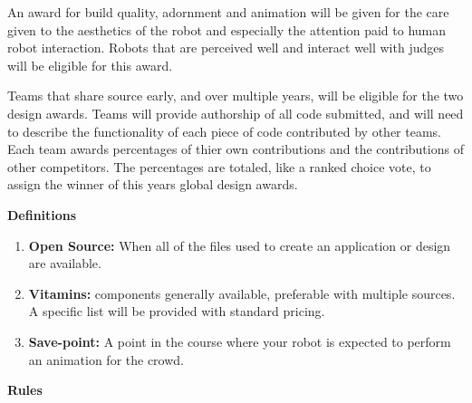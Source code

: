 \documentclass{article}
\begin{document}
 An award for build quality, adornment and animation will be given for the care given to the aesthetics of the robot and especially the attention paid to human robot interaction. Robots that are perceived well and interact well with judges will be eligible for this award. 
 
  Teams that share source early, and over multiple years, will be eligible for the two design awards. Teams will provide authorship of all code submitted, and will need to describe the functionality of each piece of code contributed by other teams. Each team awards percentages of thier own contributions and the contributions of other competitors. The percentages are totaled, like a ranked choice vote, to assign the winner of this years global design awards. 
 
 \pagebreak
 
{\huge \textbf{Definitions}}
\begin{enumerate}
	\item \textbf{Open Source:} When all of the files used to create an application or design are available.
	\item \textbf{Vitamins:} components generally available, preferable with multiple sources. A specific list will be provided with standard pricing.
	\item \textbf{Save-point:} A point in the course where your robot is expected to perform an animation for the crowd.  
\end{enumerate}

  \pagebreak
{\huge \textbf{Rules}}
\end{document}
